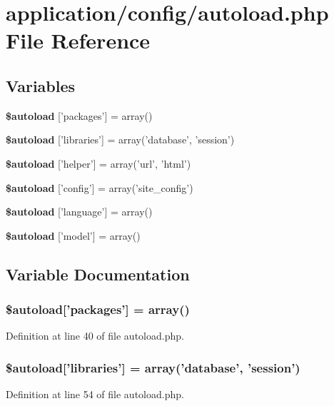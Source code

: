 \section{application/config/autoload.php File Reference}
\label{autoload_8php}
\subsection*{Variables}
\begin{DoxyCompactItemize}
\item 
{\bf \$autoload} ['packages'] = array()
\item 
{\bf \$autoload} ['libraries'] = array('database', 'session')
\item 
{\bf \$autoload} ['helper'] = array('url', 'html')
\item 
{\bf \$autoload} ['config'] = array('site\-\_\-config')
\item 
{\bf \$autoload} ['language'] = array()
\item 
{\bf \$autoload} ['model'] = array()
\end{DoxyCompactItemize}


\subsection{Variable Documentation}
\subsubsection[{\$autoload}]{\setlength{\rightskip}{0pt plus 5cm}\$autoload['packages'] = array()}\label{autoload_8php_ab562c5bbb18f14d6b6b7014d9166625d}


Definition at line 40 of file autoload.\-php.

\subsubsection[{\$autoload}]{\setlength{\rightskip}{0pt plus 5cm}\$autoload['libraries'] = array('database', 'session')}\label{autoload_8php_ab86d0a1a62e12b528eacaa7100bc4d93}


Definition at line 54 of file autoload.\-php.

